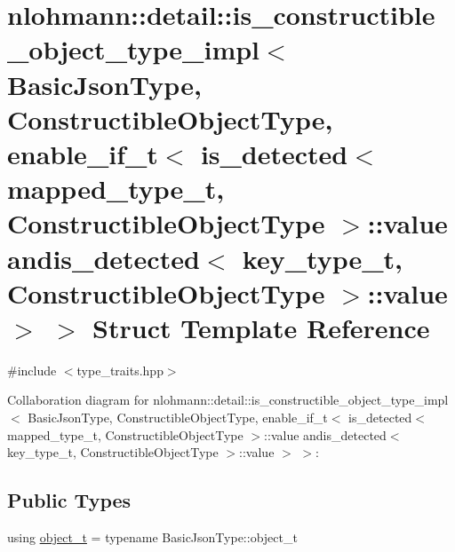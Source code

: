 \hypertarget{structnlohmann_1_1detail_1_1is__constructible__object__type__impl_3_01_basic_json_type_00_01_con54f4e42d1833d70d2e8917d37429aa30}{}\section{nlohmann\+:\+:detail\+:\+:is\+\_\+constructible\+\_\+object\+\_\+type\+\_\+impl$<$ Basic\+Json\+Type, Constructible\+Object\+Type, enable\+\_\+if\+\_\+t$<$ is\+\_\+detected$<$ mapped\+\_\+type\+\_\+t, Constructible\+Object\+Type $>$\+:\+:value andis\+\_\+detected$<$ key\+\_\+type\+\_\+t, Constructible\+Object\+Type $>$\+:\+:value $>$ $>$ Struct Template Reference}
\label{structnlohmann_1_1detail_1_1is__constructible__object__type__impl_3_01_basic_json_type_00_01_con54f4e42d1833d70d2e8917d37429aa30}


{\ttfamily \#include $<$type\+\_\+traits.\+hpp$>$}



Collaboration diagram for nlohmann\+:\+:detail\+:\+:is\+\_\+constructible\+\_\+object\+\_\+type\+\_\+impl$<$ Basic\+Json\+Type, Constructible\+Object\+Type, enable\+\_\+if\+\_\+t$<$ is\+\_\+detected$<$ mapped\+\_\+type\+\_\+t, Constructible\+Object\+Type $>$\+:\+:value andis\+\_\+detected$<$ key\+\_\+type\+\_\+t, Constructible\+Object\+Type $>$\+:\+:value $>$ $>$\+:
\subsection*{Public Types}
\begin{DoxyCompactItemize}
\item 
using \hyperlink{structnlohmann_1_1detail_1_1is__constructible__object__type__impl_3_01_basic_json_type_00_01_con54f4e42d1833d70d2e8917d37429aa30_a21732795bdcd199b6ceebe6675e9683e}{object\+\_\+t} = typename Basic\+Json\+Type\+::object\+\_\+t
\end{DoxyCompactItemize}
